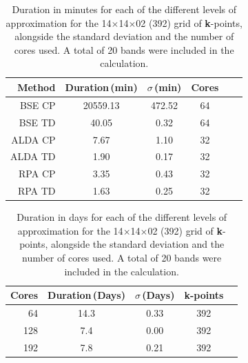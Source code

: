 \documentclass[aps,prb,10pt,superscriptaddress,notitlepage,endfloats]{revtex4-1}
\begin{document}
\begin{table}[t]
\caption{Duration in minutes for each of the different levels of approximation
for the 14$\times$14$\times$02 (392) grid of \textbf{k}-points, alongside the
standard deviation and the number of cores used. A total of 20 bands were
included in the calculation.}
\label{tab:times}
\begin{ruledtabular}
\begin{tabular}{ r c c c c c }
Method & Duration\,(min) & $\sigma$\,(min) & Cores\\
\hline
BSE CP  & 20559.13       & 472.52          & 64\\
BSE TD  &    40.05       &   0.32          & 64\\
ALDA CP &     7.67       &   1.10          & 32\\
ALDA TD &     1.90       &   0.17          & 32\\
RPA CP  &     3.35       &   0.43          & 32\\
RPA TD  &     1.63       &   0.25          & 32
\end{tabular}
\end{ruledtabular}
\end{table}

\begin{table}[t]
\caption{Duration in days for each of the different levels of approximation
for the 14$\times$14$\times$02 (392) grid of \textbf{k}-points, alongside the
standard deviation and the number of cores used. A total of 20 bands were
included in the calculation.}
\label{tab:cores}
\begin{ruledtabular}
\begin{tabular}{ r c c c c }
Cores & Duration\,(Days) & $\sigma$\,(Days) & \textbf{k}-points\\
\hline
 64   & 14.3             & 0.33             & 392 \\
128   &  7.4             & 0.00             & 392 \\
192   &  7.8             & 0.21             & 392
\end{tabular}
\end{ruledtabular}
\end{table}




\end{document}
